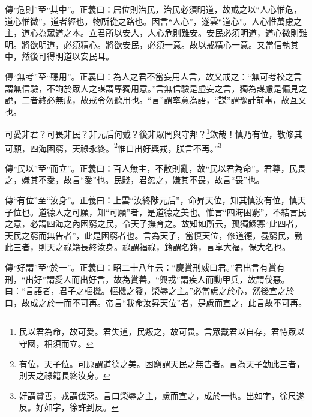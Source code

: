 {\noindent\zhuan{}\fzbyks 傳“危則”至“其中”。正義曰：居位則治民，治民必須明道，故戒之以“人心惟危，道心惟微”。道者經也，物所從之路也。因言“人心”，遂雲“道心”。人心惟萬慮之主，道心為眾道之本。立君所以安人，人心危則難安。安民必須明道，道心微則難明。將欲明道，必須精心。將欲安民，必須一意。故以戒精心一意。又當信執其中，然後可得明道以安民耳。 \par}

{\noindent\zhuan{}\fzbyks 傳“無考”至“聽用”。正義曰：為人之君不當妄用人言，故又戒之：“無可考校之言謂無信驗，不詢於眾人之謀謂專獨用意。”言無信驗是虛妄之言，獨為謀慮是偏見之說，二者終必無成，故戒令勿聽用也。“言”謂率意為語，“謀”謂豫計前事，故互文也。 \par}

可愛非君？可畏非民？非元后何戴？後非眾罔與守邦？\footnote{民以君為命，故可愛。君失道，民叛之，故可畏。言眾戴君以自存，君恃眾以守國，相須而立。}欽哉！慎乃有位，敬修其可願，四海困窮，天祿永終。\footnote{有位，天子位。可原謂道德之美。困窮謂天民之無告者。言為天子勤此三者，則天之祿籍長終汝身。}惟口出好興戎，朕言不再。”\footnote{好謂賞善，戎謂伐惡。言口榮辱之主，慮而宣之，成於一也。出如字，徐尺遂反。好如字，徐許到反。}

{\noindent\zhuan{}\fzbyks 傳“民以”至“而立”。正義曰：百人無主，不散則亂，故“民以君為命”。君尊，民畏之，嫌其不愛，故言“愛”也。民賤，君忽之，嫌其不畏，故言“畏”也。 \par}

{\noindent\zhuan{}\fzbyks 傳“有位”至“汝身”。正義曰：上雲“汝終陟元后”，命昇天位，知其慎汝有位，慎天子位也。道德人之可願，知“可願”者，是道德之美也。惟言“四海困窮”，不結言民之意，必謂四海之內困窮之民，令天子撫育之。故知如所云，孤獨鰥寡“此四者，天民之窮而無告者”，此是困窮者也。言為天子，當慎天位，修道德，養窮民，勤此三者，則天之祿籍長終汝身。祿謂福祿，籍謂名籍，言享大福，保大名也。 \par}

{\noindent\zhuan{}\fzbyks 傳“好謂”至“於一”。正義曰：昭二十八年云：“慶賞刑威曰君。”君出言有賞有刑，“出好”謂愛人而出好言，故為賞善。“興戎”謂疾人而動甲兵，故謂伐惡。曰：“言語者，君子之樞機。樞機之發，榮辱之主。”必當慮之於心，然後宣之於口，故成之於一而不可再。帝言“我命汝昇天位”者，是慮而宣之，此言故不可再。 \par}

